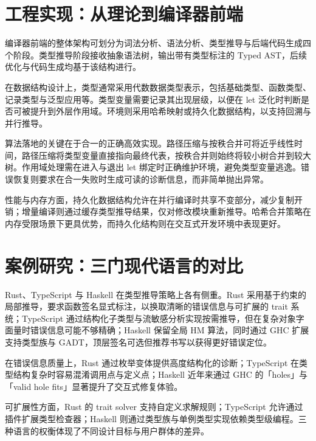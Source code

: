 \chapter{工程实现：从理论到编译器前端}
编译器前端的整体架构可划分为词法分析、语法分析、类型推导与后端代码生成四个阶段。类型推导阶段接收抽象语法树，输出带有类型标注的 Typed AST，后续优化与代码生成均基于该结构进行。\par
在数据结构设计上，类型通常采用代数数据类型表示，包括基础类型、函数类型、记录类型与泛型应用等。类型变量需要记录其出现层级，以便在 let 泛化时判断是否可被提升到外层作用域。环境则采用哈希映射或持久化数据结构，以支持回溯与并行推导。\par
算法落地的关键在于合一的正确高效实现。路径压缩与按秩合并可将近乎线性时间，路径压缩将类型变量直接指向最终代表，按秩合并则始终将较小树合并到较大树。作用域处理需在进入与退出 let 绑定时正确维护环境，避免类型变量逃逸。错误恢复则要求在合一失败时生成可读的诊断信息，而非简单抛出异常。\par
性能与内存方面，持久化数据结构允许在并行编译时共享不变部分，减少复制开销；增量编译则通过缓存类型推导结果，仅对修改模块重新推导。哈希合并策略在内存受限场景下更具优势，而持久化结构则在交互式开发环境中表现更好。\par
\chapter{案例研究：三门现代语言的对比}
Rust、TypeScript 与 Haskell 在类型推导策略上各有侧重。Rust 采用基于约束的局部推导，要求函数签名显式标注，以换取清晰的错误信息与可扩展的 trait 系统；TypeScript 通过结构化子类型与流敏感分析实现按需推导，但在复杂对象字面量时错误信息可能不够精确；Haskell 保留全局 HM 算法，同时通过 GHC 扩展支持类型族与 GADT，顶层签名可选但推荐书写以获得更好错误定位。\par
在错误信息质量上，Rust 通过枚举变体提供高度结构化的诊断；TypeScript 在类型结构复杂时容易混淆调用点与定义点；Haskell 近年来通过 GHC 的「holes」与「valid hole fits」显著提升了交互式修复体验。\par
可扩展性方面，Rust 的 trait solver 支持自定义求解规则；TypeScript 允许通过插件扩展类型检查器；Haskell 则通过类型族与单例类型实现依赖类型级编程。三种语言的权衡体现了不同设计目标与用户群体的差异。\par
